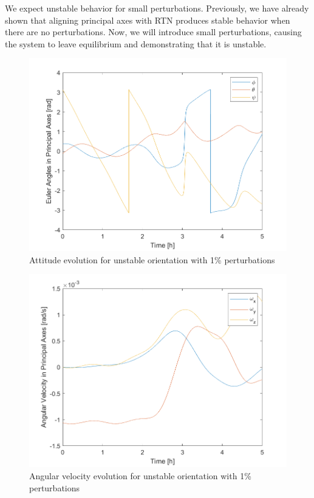 We expect unstable behavior for small perturbations. Previously, we have already shown that aligning principal axes with RTN produces stable behavior when there are no perturbations. Now, we will introduce small perturbations, causing the system to leave equilibrium and demonstrating that it is unstable.

\begin{figure}[H]
\centering
\includegraphics[scale=0.6]{Images/ps5_problem1b_angle.png}
\caption{Attitude evolution for unstable orientation with 1\% perturbations}
\label{fig:ps5_problem1b_angle}
\end{figure}

\begin{figure}[H]
\centering
\includegraphics[scale=0.6]{Images/ps5_problem1b_angvel.png}
\caption{Angular velocity evolution for unstable orientation with 1\% perturbations}
\label{fig:ps5_problem1b_angvel}
\end{figure}


